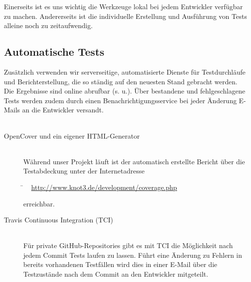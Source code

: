 Einerseits ist es uns wichtig die Werkzeuge lokal bei jedem Entwickler verfügbar zu machen. Andererseits ist die individuelle Erstellung und Ausführung von Tests alleine noch zu zeitaufwendig. 



\subsection{Automatische Tests}
\label{Abschnitt:Programmfehler:Werkzeuge:Automatisiert}

Zusätzlich verwenden wir serverseitige, automatisierte Dienste für Testdurchläufe und Berichterstellung, die so ständig auf den neuesten Stand gebracht werden. Die Ergebnisse sind online abrufbar (s. u.). Über bestandene und fehlgeschlagene Tests werden zudem durch einen Benachrichtigungsservice bei jeder Änderung E-Mails an die Entwickler versandt.
\\
\\


\begin{description}

	\item[OpenCover und ein eigener HTML-Generator] \hfill
	\\
	
	Während unser Projekt läuft ist der automatisch erstellte Bericht über die Testabdeckung unter der Internetadresse
	
	\begin{tabbing}
			\= ~ \href {http://www.knot3.de/development/coverage.php}
					   {http://www.knot3.de/development/coverage.php}
					   
	\end{tabbing} erreichbar.
	\\
	
	\item[Travis Continuous Integration (TCI)] \hfill
	\\
	
	Für private GitHub-Repositories gibt es mit TCI die Möglichkeit nach jedem Commit Tests laufen zu lassen.
	Führt eine Änderung zu Fehlern in bereits vorhandenen Testfällen wird dies in einer E-Mail über die Testzustände nach dem Commit an den Entwickler mitgeteilt.

\end{description}


